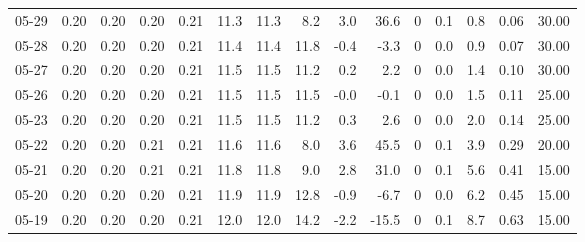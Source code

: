 \begin{threeparttable}
{\begin{tabular}{lrrrrrrrrrrrrrr}
  05-29 &          0.20 &          0.20 &          0.20 &        0.21 &                11.3 &               11.3 &                 8.2 &        3.0 &         36.6 &              0 &                 0.1 &              0.8 &            0.06 &                  30.00 \\
  05-28 &          0.20 &          0.20 &          0.20 &        0.21 &                11.4 &               11.4 &                11.8 &       -0.4 &         -3.3 &              0 &                 0.0 &              0.9 &            0.07 &                  30.00 \\
  05-27 &          0.20 &          0.20 &          0.20 &        0.21 &                11.5 &               11.5 &                11.2 &        0.2 &          2.2 &              0 &                 0.0 &              1.4 &            0.10 &                  30.00 \\
  05-26 &          0.20 &          0.20 &          0.20 &        0.21 &                11.5 &               11.5 &                11.5 &       -0.0 &         -0.1 &              0 &                 0.0 &              1.5 &            0.11 &                  25.00 \\
  05-23 &          0.20 &          0.20 &          0.20 &        0.21 &                11.5 &               11.5 &                11.2 &        0.3 &          2.6 &              0 &                 0.0 &              2.0 &            0.14 &                  25.00 \\
  05-22 &          0.20 &          0.20 &          0.21 &        0.21 &                11.6 &               11.6 &                 8.0 &        3.6 &         45.5 &              0 &                 0.1 &              3.9 &            0.29 &                  20.00 \\
  05-21 &          0.20 &          0.20 &          0.21 &        0.21 &                11.8 &               11.8 &                 9.0 &        2.8 &         31.0 &              0 &                 0.1 &              5.6 &            0.41 &                  15.00 \\
  05-20 &          0.20 &          0.20 &          0.20 &        0.21 &                11.9 &               11.9 &                12.8 &       -0.9 &         -6.7 &              0 &                 0.0 &              6.2 &            0.45 &                  15.00 \\
  05-19 &          0.20 &          0.20 &          0.20 &        0.21 &                12.0 &               12.0 &                14.2 &       -2.2 &        -15.5 &              0 &                 0.1 &              8.7 &            0.63 &                  15.00 \\

\end{tabular}}
\end{threeparttable}
